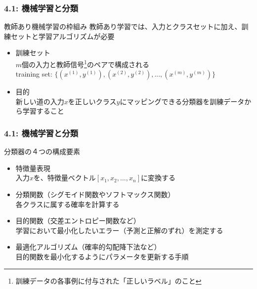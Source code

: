 \documentclass[unicode,11pt]{beamer} %
\begin{document}
\begin{frame}
    \frametitle{4.1: 機械学習と分類}
    \begin{alertblock}{教師あり機械学習の枠組み}
        教師あり学習では、入力とクラスセットに加え、訓練セットと学習アルゴリズムが必要
        \begin{itemize}
            \item 訓練セット\\$m$個の入力と教師信号\footnote{訓練データの各事例に付与された「正しいラベル」のこと}のペアで構成される\\training set: $\{(x^{(1)}, y^{(1)}), (x^{(2)}, y^{(2)}), ... , (x^{(m)}, y^{(m)})\}$
            \item 目的\\新しい道の入力$x$を正しいクラス$y$にマッピングできる分類器を訓練データから学習すること
        \end{itemize}
    \end{alertblock}
\end{frame}

\begin{frame}
    \frametitle{4.1: 機械学習と分類}
    \begin{alertblock}{分類器の４つの構成要素}
        \begin{itemize}
            \item 特徴量表現 \\ 入力$x$を、特徴量ベクトル$[x_1, x_2, ..., x_n]$に変換する 
            \item 分類関数（シグモイド関数やソフトマックス関数） \\ 各クラスに属する確率を計算する
            \item 目的関数（交差エントロピー関数など）\\ 学習において最小化したいエラー（予測と正解のずれ）を測定する
            \item 最適化アルゴリズム（確率的勾配降下法など）\\ 目的関数を最小化するようにパラメータを更新する手順
        \end{itemize}
    \end{alertblock}
\end{frame}
\end{document}
